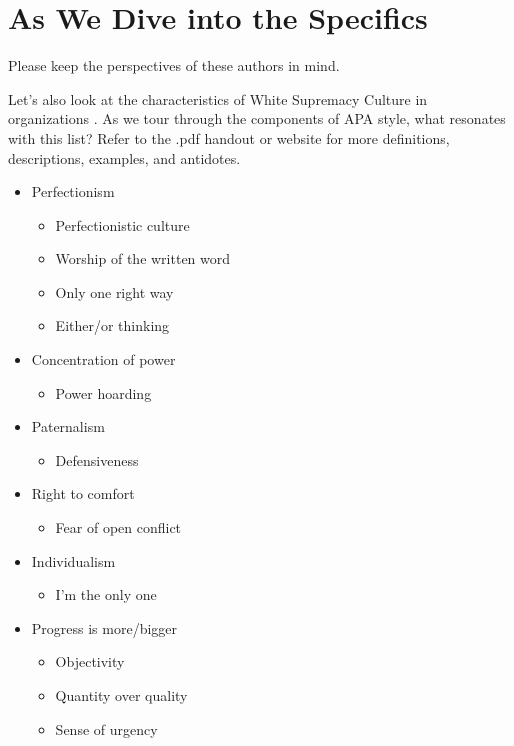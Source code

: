 \documentclass[
  english,
]{book}
\providecommand{\tightlist}{%
  \setlength{\itemsep}{0pt}\setlength{\parskip}{0pt}}
\begin{document}
\hypertarget{as-we-dive-into-the-specifics}{%
\section{As We Dive into the Specifics}\label{as-we-dive-into-the-specifics}}

Please keep the perspectives of these authors in mind.

Let's also look at the characteristics of White Supremacy Culture in organizations \citep{noauthor_white_nodate}. As we tour through the components of APA style, what resonates with this list? Refer to the .pdf handout or website for more definitions, descriptions, examples, and antidotes.

\begin{itemize}
\tightlist
\item
  Perfectionism

  \begin{itemize}
  \tightlist
  \item
    Perfectionistic culture
  \item
    Worship of the written word
  \item
    Only one right way
  \item
    Either/or thinking
  \end{itemize}
\item
  Concentration of power

  \begin{itemize}
  \tightlist
  \item
    Power hoarding
  \end{itemize}
\item
  Paternalism

  \begin{itemize}
  \tightlist
  \item
    Defensiveness
  \end{itemize}
\item
  Right to comfort

  \begin{itemize}
  \tightlist
  \item
    Fear of open conflict
  \end{itemize}
\item
  Individualism

  \begin{itemize}
  \tightlist
  \item
    I'm the only one
  \end{itemize}
\item
  Progress is more/bigger

  \begin{itemize}
  \tightlist
  \item
    Objectivity
  \item
    Quantity over quality
  \item
    Sense of urgency
  \end{itemize}
\end{itemize}
\end{document}
